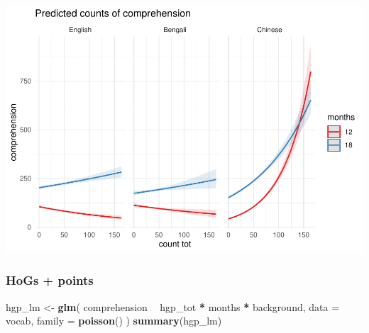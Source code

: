 \documentclass[]{article}
\newenvironment{Shaded}{\begin{snugshade}}{\end{snugshade}}
\newcommand{\DataTypeTok}[1]{\textcolor[rgb]{0.13,0.29,0.53}{#1}}
\newcommand{\KeywordTok}[1]{\textcolor[rgb]{0.13,0.29,0.53}{\textbf{#1}}}
\newcommand{\NormalTok}[1]{#1}
\newcommand{\OperatorTok}[1]{\textcolor[rgb]{0.81,0.36,0.00}{\textbf{#1}}}
\newcommand{\StringTok}[1]{\textcolor[rgb]{0.31,0.60,0.02}{#1}}
\begin{document}
\includegraphics{supplement_files/figure-latex/all-gest-lm-plot-1.pdf}

\hypertarget{hogs-points}{%
\subsubsection{HoGs + points}\label{hogs-points}}

\begin{Shaded}
\begin{Highlighting}[]
\NormalTok{hgp_lm <-}\StringTok{ }\KeywordTok{glm}\NormalTok{(}
\NormalTok{  comprehension }\OperatorTok{~}
\StringTok{    }\NormalTok{hgp_tot }\OperatorTok{*}
\StringTok{    }\NormalTok{months }\OperatorTok{*}
\StringTok{    }\NormalTok{background,}
  \DataTypeTok{data =}\NormalTok{ vocab,}
  \DataTypeTok{family =} \KeywordTok{poisson}\NormalTok{()}
\NormalTok{)}
\KeywordTok{summary}\NormalTok{(hgp_lm)}
\end{Highlighting}
\end{Shaded}
\end{document}
